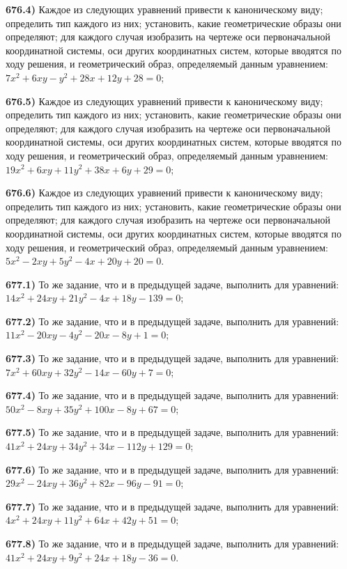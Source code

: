 \textbf{676.4)} Каждое из следующих уравнений привести к каноническому виду; определить тип каждого из них; установить, какие геометрические образы они определяют; для каждого случая изобразить на чертеже оси первоначальной координатной системы, оси других координатных систем, которые вводятся по ходу решения, и геометрический образ, определяемый данным уравнением: $7 x^2+6 x y-y^2+28 x+12 y+28=0$;

\textbf{676.5)} Каждое из следующих уравнений привести к каноническому виду; определить тип каждого из них; установить, какие геометрические образы они определяют; для каждого случая изобразить на чертеже оси первоначальной координатной системы, оси других координатных систем, которые вводятся по ходу решения, и геометрический образ, определяемый данным уравнением: $19 x^2+6 x y+11 y^2+38 x+6 y+29=0$;

\textbf{676.6)} Каждое из следующих уравнений привести к каноническому виду; определить тип каждого из них; установить, какие геометрические образы они определяют; для каждого случая изобразить на чертеже оси первоначальной координатной системы, оси других координатных систем, которые вводятся по ходу решения, и геометрический образ, определяемый данным уравнением: $5 x^2-2 x y+5 y^2-4 x+20 y+20=0$.

\textbf{677.1)} То же задание, что и в предыдущей задаче, выполнить для уравнений: $14 x^2+24 x y+21 y^2-4 x+18 y-139=0$;

\textbf{677.2)} То же задание, что и в предыдущей задаче, выполнить для уравнений: $11 x^2-20 x y-4 y^2-20 x-8 y+1=0$;

\textbf{677.3)} То же задание, что и в предыдущей задаче, выполнить для уравнений: $7 x^2+60 x y+32 y^2-14 x-60 y+7=0$;

\textbf{677.4)} То же задание, что и в предыдущей задаче, выполнить для уравнений: $50 x^2-8 x y+35 y^2+100 x-8 y+67=0$;

\textbf{677.5)} То же задание, что и в предыдущей задаче, выполнить для уравнений: $41 x^2+24 x y+34 y^2+34 x-112 y+129=0$;

\textbf{677.6)} То же задание, что и в предыдущей задаче, выполнить для уравнений: $29 x^2-24 x y+36 y^2+82 x-96 y-91=0$;

\textbf{677.7)} То же задание, что и в предыдущей задаче, выполнить для уравнений: $4 x^2+24 x y+11 y^2+64 x+42 y+51=0$;

\textbf{677.8)} То же задание, что и в предыдущей задаче, выполнить для уравнений: $41 x^2+24 x y+9 y^2+24 x+18 y-36=0$.

